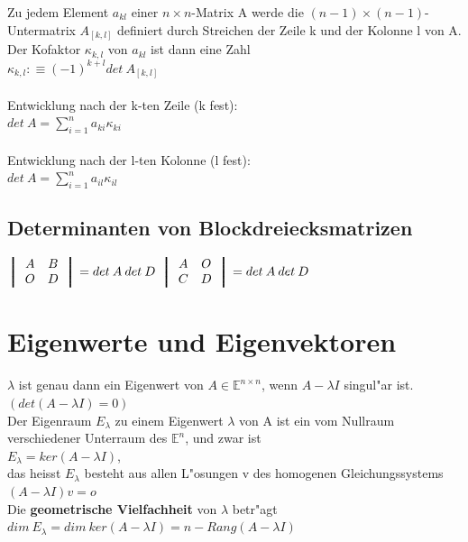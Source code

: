\documentclass[10pt, a4paper, twocolumn]{scrartcl}
\begin{document}
Zu jedem Element $a_{kl}$ einer $n\times n$-Matrix A werde die $(n-1)\times(n-1)$-Untermatrix $A_{[k,l]}$ definiert durch Streichen der Zeile k und der Kolonne l von A. Der Kofaktor $\kappa_{k,l}$ von $a_{kl}$ ist dann eine Zahl\\
$\kappa_{k,l}:\equiv(-1)^{k+l}det\:A_{[k,l]}$\\\\

Entwicklung nach der k-ten Zeile (k fest):\\
$det\:A=\sum^n_{i=1}a_{ki}\kappa_{ki}$\\\\

Entwicklung nach der l-ten Kolonne (l fest):\\
$det\:A=\sum^n_{i=1}a_{il}\kappa_{il}$


\subsection{Determinanten von Blockdreiecksmatrizen}

$
\left \bracevert
\begin{array}{cc}
A & B \\
O & D 
\end{array}
\right \bracevert
=det\:A\:det\:D
$
$
\left \bracevert
\begin{array}{cc}
A & O \\
C & D 
\end{array}
\right \bracevert
=det\:A\:det\:D
$


\section{Eigenwerte und Eigenvektoren}

$\lambda $ ist genau dann ein Eigenwert von $A \in \mathbb{E}^{n\times n}$, wenn $A-\lambda I$ singul"ar ist.$(det (A-\lambda I)=0)$\\
Der Eigenraum $E_\lambda$ zu einem Eigenwert $\lambda$ von A ist ein vom Nullraum verschiedener Unterraum des $\mathbb{E}^n$, und zwar ist\\
$E_\lambda=ker(A-\lambda I)$,\\
das heisst $E_\lambda$ besteht aus allen L"osungen v des homogenen Gleichungssystems\\
$(A-\lambda I)v=o$\\
Die {\bf geometrische Vielfachheit} von $\lambda$ betr"agt\\
$dim\:E_\lambda = dim\:ker(A-\lambda I)= n - Rang(A-\lambda I)$\\\\
\end{document}
